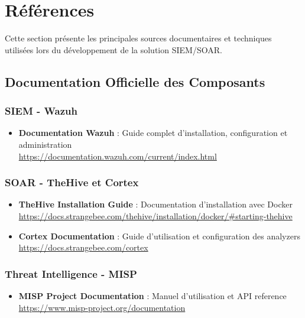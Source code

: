 \chapter*{Références}

Cette section présente les principales sources documentaires et techniques utilisées lors du développement de la solution SIEM/SOAR.

\section*{Documentation Officielle des Composants}

\subsection*{SIEM - Wazuh}
\begin{itemize}
    \item \textbf{Documentation Wazuh} : Guide complet d'installation, configuration et administration \\
          \url{https://documentation.wazuh.com/current/index.html}
\end{itemize}

\subsection*{SOAR - TheHive et Cortex}
\begin{itemize}
    \item \textbf{TheHive Installation Guide} : Documentation d'installation avec Docker \\
          \url{https://docs.strangebee.com/thehive/installation/docker/#starting-thehive}

    \item \textbf{Cortex Documentation} : Guide d'utilisation et configuration des analyzers \\
          \url{https://docs.strangebee.com/cortex}
\end{itemize}

\subsection*{Threat Intelligence - MISP}
\begin{itemize}
    \item \textbf{MISP Project Documentation} : Manuel d'utilisation et API reference \\
          \url{https://www.misp-project.org/documentation}
\end{itemize}

